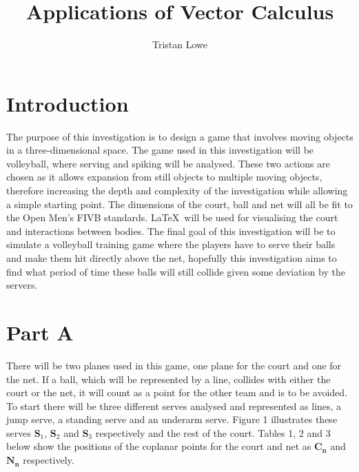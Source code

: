 \documentclass{article}
\title{Applications of Vector Calculus}
\author{Tristan Lowe}
\begin{document}
\maketitle

\section*{Introduction}

The purpose of this investigation is to design a game that involves moving objects in a three-dimensional space. The game used in this investigation will be volleyball, where serving and spiking will be analysed. These two actions are chosen as it allows expansion from still objects to multiple moving objects, therefore increasing the depth and complexity of the investigation while allowing a simple starting point. The dimensions of the court, ball and net will all be fit to the Open Men's FIVB standards. \LaTeX\ will be used for visualising the court and interactions between bodies. The final goal of this investigation will be to simulate a volleyball training game where the players have to serve their balls and make them hit directly above the net, hopefully this investigation aims to find what period of time these balls will still collide given some deviation by the servers.

\section*{Part A}

There will be two planes used in this game, one plane for the court and one for the net. If a ball, which will be represented by a line, collides with either the court or the net, it will count as a point for the other team and is to be avoided. To start there will be three different serves analysed and represented as lines, a jump serve, a standing serve and an underarm serve. Figure 1 illustrates these serves \(\mathbf{S}_1\), \(\mathbf{S}_2\) and \(\mathbf{S}_3\) respectively and the rest of the court. Tables 1, 2 and 3 below show the positions of the coplanar points for the court and net as \(\mathbf{C}_\mathbf{n}\) and \(\mathbf{N}_\mathbf{n}\) respectively.

\vspace{20pt}
\end{document}
